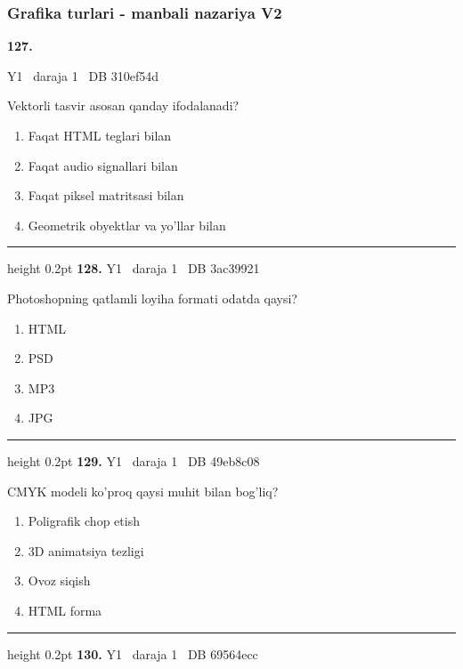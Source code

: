 \documentclass[10pt,a4paper,oneside]{article}
\begin{document}
\subsubsection{Grafika turlari - manbali nazariya V2}
\hypertarget{q127}{\textbf{\color{ink}127.}}  {\color{muted}\scriptsize Y1 \textbullet\ daraja 1 \textbullet\ DB 310ef54d}
\par
Vektorli tasvir asosan qanday ifodalanadi?
\begin{enumerate}[label=\Alph*),leftmargin=9mm]
\item Faqat HTML teglari bilan
\item Faqat audio signallari bilan
\item Faqat piksel matritsasi bilan
\item Geometrik obyektlar va yo'llar bilan
\end{enumerate}
\vspace{2mm}\hrule height 0.2pt \vspace{4mm}
\hypertarget{q128}{\textbf{\color{ink}128.}}  {\color{muted}\scriptsize Y1 \textbullet\ daraja 1 \textbullet\ DB 3ac39921}
\par
Photoshopning qatlamli loyiha formati odatda qaysi?
\begin{enumerate}[label=\Alph*),leftmargin=9mm]
\item HTML
\item PSD
\item MP3
\item JPG
\end{enumerate}
\vspace{2mm}\hrule height 0.2pt \vspace{4mm}
\hypertarget{q129}{\textbf{\color{ink}129.}}  {\color{muted}\scriptsize Y1 \textbullet\ daraja 1 \textbullet\ DB 49eb8c08}
\par
CMYK modeli ko'proq qaysi muhit bilan bog'liq?
\begin{enumerate}[label=\Alph*),leftmargin=9mm]
\item Poligrafik chop etish
\item 3D animatsiya tezligi
\item Ovoz siqish
\item HTML forma
\end{enumerate}
\vspace{2mm}\hrule height 0.2pt \vspace{4mm}
\hypertarget{q130}{\textbf{\color{ink}130.}}  {\color{muted}\scriptsize Y1 \textbullet\ daraja 1 \textbullet\ DB 69564ecc}
\end{document}
